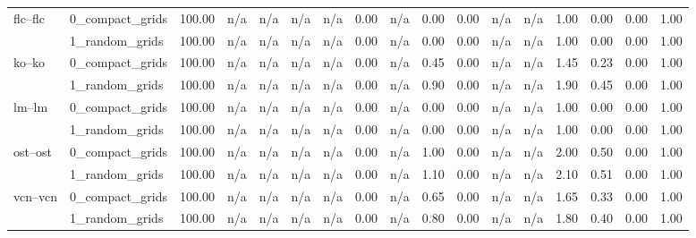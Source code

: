 \begin{tabular}{llrrrrrrrrrrrrrrr}
\cline{1-17}
\multirow[t]{2}{*}{flc--flc} & 0_compact_grids & 100.00 & n/a & n/a & n/a & n/a & 0.00 & n/a & 0.00 & 0.00 & n/a & n/a & 1.00 & 0.00 & 0.00 & 1.00 \\
 & 1_random_grids & 100.00 & n/a & n/a & n/a & n/a & 0.00 & n/a & 0.00 & 0.00 & n/a & n/a & 1.00 & 0.00 & 0.00 & 1.00 \\
\cline{1-17}
\multirow[t]{2}{*}{ko--ko} & 0_compact_grids & 100.00 & n/a & n/a & n/a & n/a & 0.00 & n/a & 0.45 & 0.00 & n/a & n/a & 1.45 & 0.23 & 0.00 & 1.00 \\
 & 1_random_grids & 100.00 & n/a & n/a & n/a & n/a & 0.00 & n/a & 0.90 & 0.00 & n/a & n/a & 1.90 & 0.45 & 0.00 & 1.00 \\
\cline{1-17}
\multirow[t]{2}{*}{lm--lm} & 0_compact_grids & 100.00 & n/a & n/a & n/a & n/a & 0.00 & n/a & 0.00 & 0.00 & n/a & n/a & 1.00 & 0.00 & 0.00 & 1.00 \\
 & 1_random_grids & 100.00 & n/a & n/a & n/a & n/a & 0.00 & n/a & 0.00 & 0.00 & n/a & n/a & 1.00 & 0.00 & 0.00 & 1.00 \\
\cline{1-17}
\multirow[t]{2}{*}{ost--ost} & 0_compact_grids & 100.00 & n/a & n/a & n/a & n/a & 0.00 & n/a & 1.00 & 0.00 & n/a & n/a & 2.00 & 0.50 & 0.00 & 1.00 \\
 & 1_random_grids & 100.00 & n/a & n/a & n/a & n/a & 0.00 & n/a & 1.10 & 0.00 & n/a & n/a & 2.10 & 0.51 & 0.00 & 1.00 \\
\cline{1-17}
\multirow[t]{2}{*}{vcn--vcn} & 0_compact_grids & 100.00 & n/a & n/a & n/a & n/a & 0.00 & n/a & 0.65 & 0.00 & n/a & n/a & 1.65 & 0.33 & 0.00 & 1.00 \\
 & 1_random_grids & 100.00 & n/a & n/a & n/a & n/a & 0.00 & n/a & 0.80 & 0.00 & n/a & n/a & 1.80 & 0.40 & 0.00 & 1.00 \\
\cline{1-17}
\bottomrule
\end{tabular}
